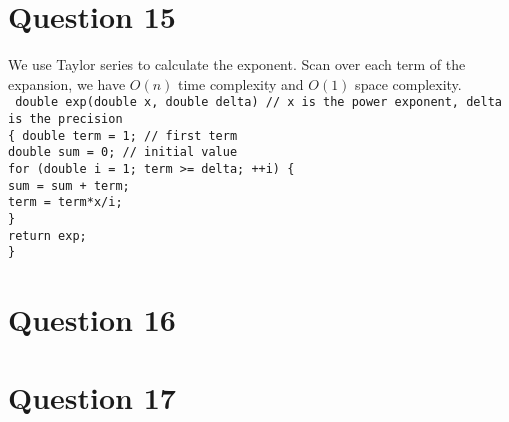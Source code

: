 \documentclass[12pt]{article}
\begin{document}
\section*{Question 15}
\begin{solution}
We use Taylor series to calculate the exponent. Scan over each term of the expansion, we have $O(n)$ time complexity and $O(1)$ space complexity. \\
\texttt{
double exp(double x, double delta)   // x is the power exponent, delta is the precision\\
\{
    double term = 1;  // first term\\
    double sum = 0;  // initial value\\ 
    for (double i = 1; term >= delta; ++i) \{\\
        sum = sum + term;\\
        term = term*x/i;\\
    \}\\
 return exp;\\
 \}}
\end{solution}

\section*{Question 16}
\begin{solution}
\end{solution}

\section*{Question 17}
\begin{solution}
\end{solution}
\end{document}
